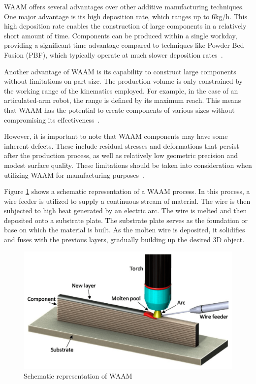WAAM offers several advantages over other additive manufacturing techniques. One major advantage is its high deposition rate, which ranges up to 6kg/h. This high deposition rate enables the construction of large components in a relatively short amount of time. Components can be produced within a single workday, providing a significant time advantage compared to techniques like Powder Bed Fusion (PBF), which typically operate at much slower deposition rates~\cite{IvanTabernero.2018}.

Another advantage of WAAM is its capability to construct large components without limitations on part size. The production volume is only constrained by the working range of the kinematics employed. For example, in the case of an articulated-arm robot, the range is defined by its maximum reach. This means that WAAM has the potential to create components of various sizes without compromising its effectiveness~\cite{Li.2019}.

However, it is important to note that WAAM components may have some inherent defects. These include residual stresses and deformations that persist after the production process, as well as relatively low geometric precision and modest surface quality. These limitations should be taken into consideration when utilizing WAAM for manufacturing purposes~\cite{Wu.2018}.

Figure \ref{WAAM} shows a schematic representation of a WAAM process. In this process, a wire feeder is utilized to supply a continuous stream of material. The wire is then subjected to high heat generated by an electric arc. The wire is melted and then deposited onto a substrate plate. The substrate plate serves as the foundation or base on which the material is built. As the molten wire is deposited, it solidifies and fuses with the previous layers, gradually building up the desired 3D object.

\begin{figure}[H]
	\centerline{\includegraphics[scale=.12]{figures/WAAM.png}}
	\caption{Schematic representation of WAAM \cite{Jin.2020}}
	\label{WAAM}
\end{figure}

